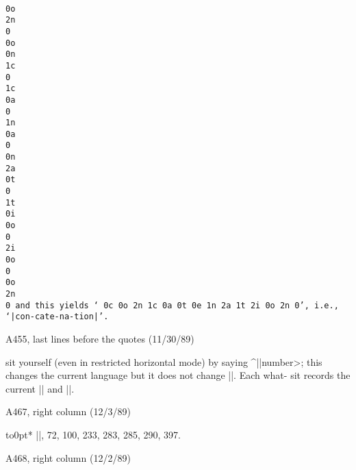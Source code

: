 {\ninepoint\vskip-10pt
\begindisplay
\tt\\0o\\2n\\0
\\0o\\0n\\1c\\0
\\1c\\0a\\0
\\1n\\0a\\0
\\0n\\2a\\0t\\0
\\1t\\0i\\0o\\0
\\2i\\0o\\0
\\0o\\2n\\0
\enddisplay
and this yields `{\tt\\0c\\0o\\2n\\1c\\0a\\0t\\0e\\1n\\2a\\1t\\2i\\0o\\2n\\0}',
i.e., `|con-cate-na-tion|'.

\bugonpage A455, last lines before the quotes (11/30/89)

\ninepoint\noindent
sit yourself (even in restricted horizontal mode) by saying
^|\setlanguage|\<number>;\break
 this changes the current language but it
does not change |\language|. Each what-\break
sit records the current
|\lefthyphenmin| and |\righthyphenmin|.

\bugonpage A467, right column (12/3/89)

\eightpoint\indent\hbox to0pt{\hss{}\hbox{*}}%
|\hfilneg|, 72, 100, 233, 283, 285, 290, 397.

\bugonpage A468, right column (12/2/89)

}
